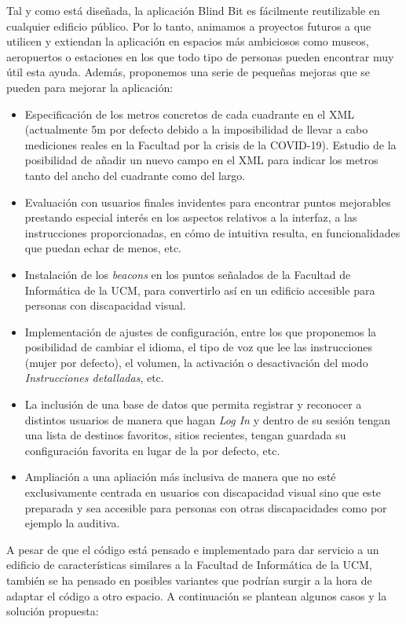 Tal y como está diseñada, la aplicación Blind Bit es fácilmente reutilizable en cualquier edificio público. Por lo tanto, animamos a proyectos futuros a que utilicen y extiendan la aplicación en espacios más ambiciosos como museos, aeropuertos o estaciones en los que todo tipo de personas pueden encontrar muy útil esta ayuda. Además, proponemos una serie de pequeñas mejoras que se pueden para mejorar la aplicación:
\begin{itemize}
	\item Especificación de los metros concretos de cada cuadrante en el XML (actualmente 5m por defecto debido a la imposibilidad de llevar a cabo mediciones reales en la Facultad por la crisis de la COVID-19). Estudio de la posibilidad de añadir un nuevo campo en el XML para indicar los metros tanto del ancho del cuadrante como del largo.
	\item Evaluación con usuarios finales invidentes para encontrar puntos mejorables prestando especial interés en los aspectos relativos a la interfaz, a las instrucciones proporcionadas, en cómo de intuitiva resulta, en funcionalidades que puedan echar de menos, etc.
	\item Instalación de los \textit{beacons} en los puntos señalados de la Facultad de Informática de la UCM, para convertirlo así en un edificio accesible para personas con discapacidad visual.
	\item Implementación de ajustes de configuración, entre los que proponemos la posibilidad de cambiar el idioma, el tipo de voz que lee las instrucciones (mujer por defecto), el volumen, la activación o desactivación del modo\textit{ Instrucciones detalladas}, etc.
	
	\item La inclusión de una base de datos que permita registrar y reconocer a distintos usuarios de manera que hagan \textit{Log In} y dentro de su sesión tengan una lista de destinos favoritos, sitios recientes, tengan guardada su configuración favorita en lugar de la por defecto, etc.
	
	\item Ampliación a una apliación más inclusiva de manera que no esté exclusivamente centrada en usuarios con discapacidad visual sino que este preparada y sea accesible para personas con otras discapacidades como por ejemplo la auditiva.
	
\end{itemize}

A pesar de que el código está pensado e implementado para dar servicio a un edificio de características similares a la Facultad de Informática de la UCM, también se ha pensado en posibles variantes que podrían surgir a la hora de adaptar el código a otro espacio. A continuación se plantean algunos casos y la solución propuesta: 

